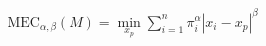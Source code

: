 \documentclass[preview]{standalone}
\begin{document}
\begin{align*}
\text{MEC}_{\alpha,\beta}(M) = \min_{x_p} \sum_{i=1}^n \pi_{i}^\alpha |x_i-x_p|^\beta
\end{align*}
\end{document}
